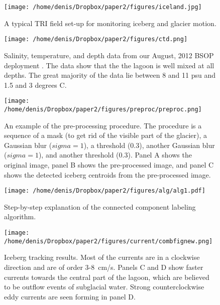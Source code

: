\begin{figure}
\centering
\texttt{[image: /home/denis/Dropbox/paper2/figures/iceland.jpg]}
\caption[A typical TRI field set-up for monitoring iceberg and glacier motion.]{A typical TRI field set-up for monitoring iceberg and glacier motion.}
\label{fig:radar}
\end{figure}


\begin{figure}
\centering
\texttt{[image: /home/denis/Dropbox/paper2/figures/ctd.png]}
\caption[Salinity, temperature, and depth data from our August, 2012 BSOP deployment \citep{voytenko2014}.]{Salinity, temperature, and depth data from our August, 2012 BSOP deployment \citep{voytenko2014}. The data show that the the lagoon is well mixed at all depths. The great majority of the data lie between 8 and 11 psu and 1.5 and 3 degrees  C.}
\label{fig:tsplot}
\end{figure}




\begin{figure}
\centering
\texttt{[image: /home/denis/Dropbox/paper2/figures/preproc/preproc.png]}
\caption[An example of the pre-processing procedure.]{An example of the pre-processing procedure. The procedure is a sequence of a mask (to get rid of the visible part of the glacier), a Gaussian blur ($sigma=1$), a threshold ($0.3$), another Gaussian blur ($sigma=1$), and another threshold ($0.3$). Panel A shows the original image, panel B shows the pre-processed image, and panel C shows the detected iceberg centroids from the pre-processed image.}
\label{fig:preproc}
\end{figure}

\begin{figure}
\centering
\texttt{[image: /home/denis/Dropbox/paper2/figures/alg/alg1.pdf]}
\caption[Step-by-step explanation of the connected component labeling algorithm.]{Step-by-step explanation of the connected component labeling algorithm.}
\label{fig:cca}
\end{figure}

\begin{figure}
\centering
\texttt{[image: /home/denis/Dropbox/paper2/figures/current/combfignew.png]}
\caption[Iceberg tracking results.]{Iceberg tracking results. Most of the currents are in a clockwise direction and are of order  3-8~cm/s. Panels C and D show faster currents towards the central part of the lagoon, which are believed to be outflow events of subglacial water. Strong counterclockwise eddy currents are seen forming in panel D.}
\label{fig:currents}
\end{figure}

